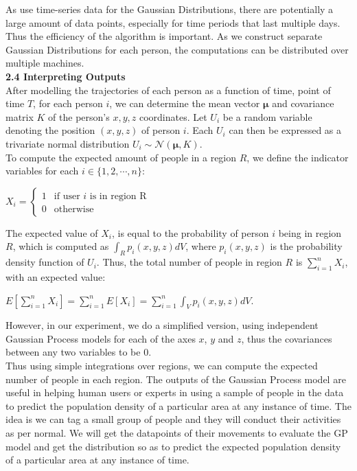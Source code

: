 \documentclass[letterpaper]{article}
\begin{document}
As use time-series data for the Gaussian Distributions, there are potentially a large amount of data points, especially for time periods that last multiple days. Thus the efficiency of the algorithm is important. As we construct separate Gaussian Distributions for each person, the computations can be distributed over multiple machines.\\

{\bf2.4  Interpreting Outputs} \\

After modelling the trajectories of each person as a function of time, point of time $T$, for each person $i$, we can determine the mean vector $\boldsymbol{\mu}$ and covariance matrix $K$ of the person's $x,y,z$ coordinates. Let $U_i$ be a random variable denoting the position $(x,y,z)$ of person $i$. Each $U_i$ can then be expressed as a trivariate normal distribution $U_i \sim \mathcal{N}(\boldsymbol{\mu},K)$.\\

To compute the expected amount of people in a region $R$, we define the indicator variables for each $i \in \{1,2,\cdots,n\}$:
\begin{center}
$X_i =
\begin{cases}
    1 &\text{if user }i\text{ is in region R}\\
    0 &\text{otherwise}
\end{cases}$
\end{center}
The expected value of $X_i$, is equal to the probability of person $i$ being in region $R$, which is computed as $\int_R p_i(x,y,z)dV$, where $p_i(x,y,z)$ is the probability density function of $U_i$. Thus, the total number of people in region $R$ is $\sum_{i=1}^n X_i$, with an expected value:
\begin{center}
$\displaystyle E[\sum_{i=1}^n X_i] = \sum_{i=1}^n E[X_i] = \sum_{i=1}^n \int_V p_i(x,y,z)dV$.
\end{center}

However, in our experiment, we do a simplified version, using independent Gaussian Process models for each of the axes $x$, $y$ and $z$, thus the covariances between any two variables to be $0$. \\

Thus using simple integrations over regions, we can compute the expected number of people in each region. The outputs of the Gaussian Process model are useful in helping human users or experts in using a sample of people in the data to predict the population density of a particular area at any instance of time. The idea is we can tag a small group of people and they will conduct their activities as per normal. We will get the datapoints of their movements to evaluate the GP model and get the distribution so as to predict the expected population density of a particular area at any instance of time. \\
\end{document}
